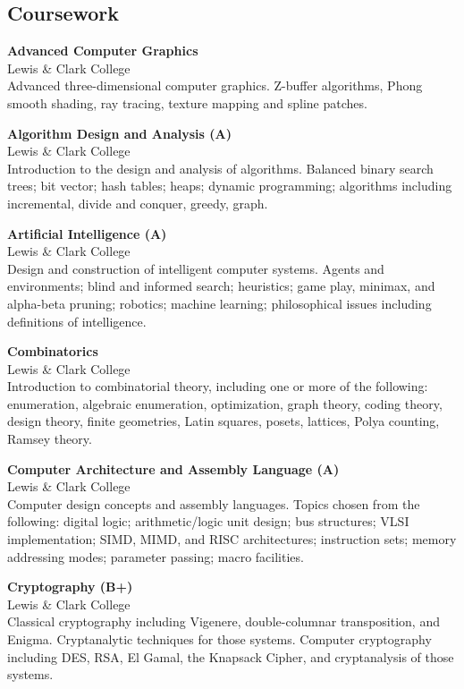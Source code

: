 \documentclass{res}
\begin{document}
\begin{resume}
\section{Coursework}
    \textbf{Advanced Computer Graphics}\\
    Lewis \& Clark College\\
    Advanced three-dimensional computer graphics. Z-buffer algorithms, Phong
    smooth shading, ray tracing, texture mapping and spline patches.

    \textbf{Algorithm Design and Analysis (A)}\\
    Lewis \& Clark College\\
    Introduction to the design and analysis of algorithms.  Balanced binary
    search trees; bit vector; hash tables; heaps; dynamic programming;
    algorithms including incremental, divide and conquer, greedy, graph.

    \textbf{Artificial Intelligence (A)}\\
    Lewis \& Clark College\\
    Design and construction of intelligent computer systems. Agents and
    environments; blind and informed search; heuristics; game play, minimax, and
    alpha-beta pruning; robotics; machine learning; philosophical issues
    including definitions of intelligence.

    \textbf{Combinatorics}\\
    Lewis \& Clark College\\
    Introduction to combinatorial theory, including one or more of the
    following: enumeration, algebraic enumeration, optimization, graph theory,
    coding theory, design theory, finite geometries, Latin squares, posets,
    lattices, Polya counting, Ramsey theory.

    \textbf{Computer Architecture and Assembly Language (A)}\\
    Lewis \& Clark College\\
    Computer design concepts and assembly languages. Topics chosen from the
    following: digital logic; arithmetic/logic unit design; bus structures; VLSI
    implementation; SIMD, MIMD, and RISC architectures; instruction sets; memory
    addressing modes; parameter passing; macro facilities.

    \textbf{Cryptography (B+)}\\
    Lewis \& Clark College\\
    Classical cryptography including Vigenere, double-columnar transposition,
    and Enigma. Cryptanalytic techniques for those systems.  Computer
    cryptography including DES, RSA, El Gamal, the Knapsack Cipher, and
    cryptanalysis of those systems.


\end{resume}
\end{document}
